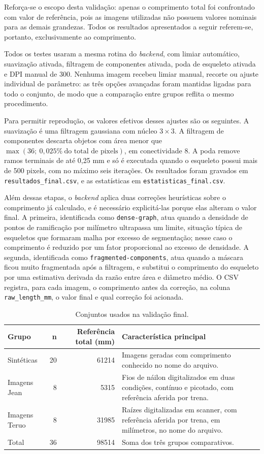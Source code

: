 \documentclass[12pt]{article}
\begin{document}
Reforça-se o escopo desta validação: apenas o comprimento total foi confrontado com valor de referência, pois as imagens utilizadas não possuem valores nominais para as demais grandezas. Todos os resultados apresentados a seguir referem-se, portanto, exclusivamente ao comprimento.

Todos os testes usaram a mesma rotina do \textit{backend}, com limiar automático, suavização ativada, filtragem de componentes ativada, poda de esqueleto ativada e DPI manual de 300. Nenhuma imagem recebeu limiar manual, recorte ou ajuste individual de parâmetro: as três opções avançadas foram mantidas ligadas para todo o conjunto, de modo que a comparação entre grupos reflita o mesmo procedimento.

Para permitir reprodução, os valores efetivos desses ajustes são os seguintes. A suavização é uma filtragem gaussiana com núcleo $3 \times 3$. A filtragem de componentes descarta objetos com área menor que $\max(36;\ 0{,}025\%\ \text{do total de pixels})$, em conectividade 8. A poda remove ramos terminais de até 0,25 mm e só é executada quando o esqueleto possui mais de 500 pixels, com no máximo seis iterações. Os resultados foram gravados em \texttt{resultados\_final.csv}, e as estatísticas em \texttt{estatisticas\_final.csv}.

Além dessas etapas, o \textit{backend} aplica duas correções heurísticas sobre o comprimento já calculado, e é necessário explicitá-las porque elas alteram o valor final. A primeira, identificada como \texttt{dense-graph}, atua quando a densidade de pontos de ramificação por milímetro ultrapassa um limite, situação típica de esqueletos que formaram malha por excesso de segmentação; nesse caso o comprimento é reduzido por um fator proporcional ao excesso de densidade. A segunda, identificada como \texttt{fragmented-components}, atua quando a máscara ficou muito fragmentada após a filtragem, e substitui o comprimento do esqueleto por uma estimativa derivada da razão entre área e diâmetro médio. O CSV registra, para cada imagem, o comprimento antes da correção, na coluna \texttt{raw\_length\_mm}, o valor final e qual correção foi acionada.

\vspace{5mm}

\begin{table}[!htbp]
\centering
\caption{Conjuntos usados na validação final.}
\label{tab:datasets}
\begin{tabular}{lrrp{6.8cm}}
\toprule
Grupo & n & Referência total (mm) & Característica principal \\
\midrule
Sintéticas & 20 & 61214 & Imagens geradas com comprimento conhecido no nome do arquivo. \\
Imagens Jean & 8 & 5315 & Fios de náilon digitalizados em duas condições, contínuo e picotado, com referência aferida por trena. \\
Imagens Teruo & 8 & 31985 & Raízes digitalizadas em scanner, com referência aferida por trena, em milímetros, no nome do arquivo. \\
Total & 36 & 98514 & Soma dos três grupos comparativos. \\
\bottomrule
\end{tabular}
\end{table}
\end{document}
